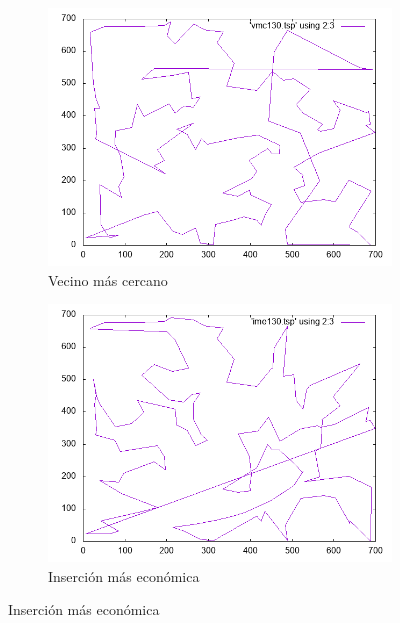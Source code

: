 \documentclass[12pt,spanish]{article}
\begin{document}
\begin{figure}[H]
\centering
\begin{subfigure}[b]{0.36\textwidth}
\includegraphics[width=\textwidth]{ch130_vmc.png}
\caption{Vecino más cercano}
\end{subfigure}
\quad
\begin{subfigure}[b]{0.36\textwidth}
\includegraphics[width=\textwidth]{ch130_ime.png}
\caption{Inserción más económica}
\end{subfigure}

\vspace{1cm}


\end{figure}
\end{document}
